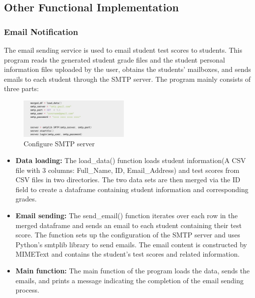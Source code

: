 \documentclass[twocolumn]{article}
\begin{document}
        \subsection{Other Functional Implementation}

        \subsubsection{Email Notification}
        The email sending service is used to email student test scores to students. This program reads the generated student grade files and the student personal information files uploaded by the user, obtains the students' mailboxes, and sends emails to each student through the SMTP server. The program mainly consists of three parts:

        \begin{figure}[ht]
            \centering
            \includegraphics[width=0.48\textwidth]{smtp.png}
            \caption{Configure SMTP server}
            \label{fig:smtp}
        \end{figure}

        \begin{itemize}
            \item \textbf{Data loading:} The load\_data() function loads student information(A CSV file with 3 columns: Full\_Name, ID, Email\_Address) and test scores from CSV files in two directories. The two data sets are then merged via the ID field to create a dataframe containing student information and corresponding grades.
            \item \textbf{Email sending:} The send\_email() function iterates over each row in the merged dataframe and sends an email to each student containing their test score. The function sets up the configuration of the SMTP server and uses Python's smtplib library to send emails. The email content is constructed by MIMEText and contains the student's test scores and related information.
            \item \textbf{Main function:} The main function of the program loads the data, sends the emails, and prints a message indicating the completion of the email sending process.
            
        \end{itemize}
        
\end{document}
